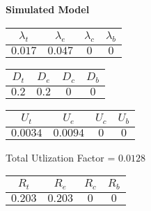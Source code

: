 \documentclass{article}
\begin{document}
\begin{minipage}{0.5\textwidth}
\centering	\textbf{Simulated Model}
\begin{table}[H]
\centering
\begin{tabular}{@{}cccc@{}}
\toprule
$\lambda_t$ & $\lambda_e$ & $\lambda_c$ & $\lambda_b$\\
\midrule
$0.017$ & $0.047$ & $0$ & $0$\\
\bottomrule
\end{tabular}
\end{table}
\begin{table}[H]
\centering
\begin{tabular}{@{}cccc@{}}
\toprule
$D_t$ & $D_e$ & $D_c$ & $D_b$\\
\midrule
$0.2$ & $0.2$ & $0$ & $0$\\
\bottomrule
\end{tabular}
\end{table}\begin{table}[H]
\centering
\begin{tabular}{@{}cccc@{}}
\toprule
$U_t$ & $U_e$ & $U_c$ & $U_b$\\
\midrule
$0.0034$ & $0.0094$ & $0$ & $0$\\
\bottomrule
\end{tabular}
\end{table}
\centering Total Utlization Factor = $0.0128$
\begin{table}[H]
\centering
\begin{tabular}{@{}cccc@{}}
\toprule
$R_t$ & $R_e$ & $R_c$ & $R_b$\\
\midrule
$0.203$ & $0.203$ & $0$ & $0$\\
\bottomrule
\end{tabular}
\end{table}
\end{minipage}
\end{document}

